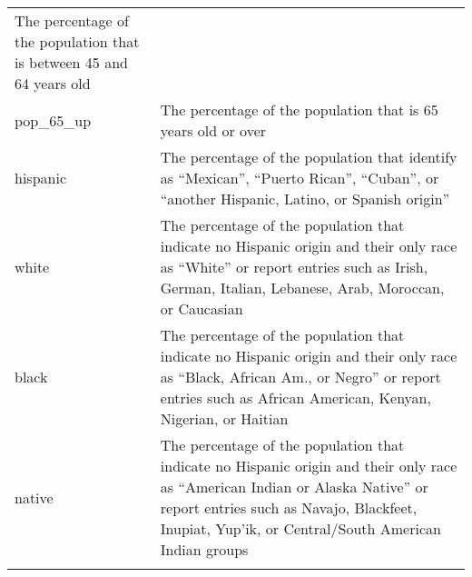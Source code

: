 \documentclass[12pt,twoside]{reedthesis}
\begin{document}
\begin{longtable}[]{@{}ll@{}}
\begin{minipage}[t]{0.50\columnwidth}
The percentage of the population that is between 45 and 64 years old\strut
\end{minipage}\tabularnewline
\begin{minipage}[t]{0.44\columnwidth}\raggedright
pop\_65\_up\strut
\end{minipage} & \begin{minipage}[t]{0.50\columnwidth}\raggedright
The percentage of the population that is 65 years old or over\strut
\end{minipage}\tabularnewline
\begin{minipage}[t]{0.44\columnwidth}\raggedright
hispanic\strut
\end{minipage} & \begin{minipage}[t]{0.50\columnwidth}\raggedright
The percentage of the population that identify as ``Mexican'', ``Puerto Rican'', ``Cuban'', or ``another Hispanic, Latino, or Spanish origin''\strut
\end{minipage}\tabularnewline
\begin{minipage}[t]{0.44\columnwidth}\raggedright
white\strut
\end{minipage} & \begin{minipage}[t]{0.50\columnwidth}\raggedright
The percentage of the population that indicate no Hispanic origin and their only race as ``White'' or report entries such as Irish, German, Italian, Lebanese, Arab, Moroccan, or Caucasian\strut
\end{minipage}\tabularnewline
\begin{minipage}[t]{0.44\columnwidth}\raggedright
black\strut
\end{minipage} & \begin{minipage}[t]{0.50\columnwidth}\raggedright
The percentage of the population that indicate no Hispanic origin and their only race as ``Black, African Am., or Negro'' or report entries such as African American, Kenyan, Nigerian, or Haitian\strut
\end{minipage}\tabularnewline
\begin{minipage}[t]{0.44\columnwidth}\raggedright
native\strut
\end{minipage} & \begin{minipage}[t]{0.50\columnwidth}\raggedright
The percentage of the population that indicate no Hispanic origin and their only race as ``American Indian or Alaska Native'' or report entries such as Navajo, Blackfeet, Inupiat, Yup'ik, or Central/South American Indian groups\strut
\end{minipage}\tabularnewline
\begin{minipage}[t]{0.44\columnwidth}\raggedright

\end{minipage}
\end{longtable}
\end{document}
